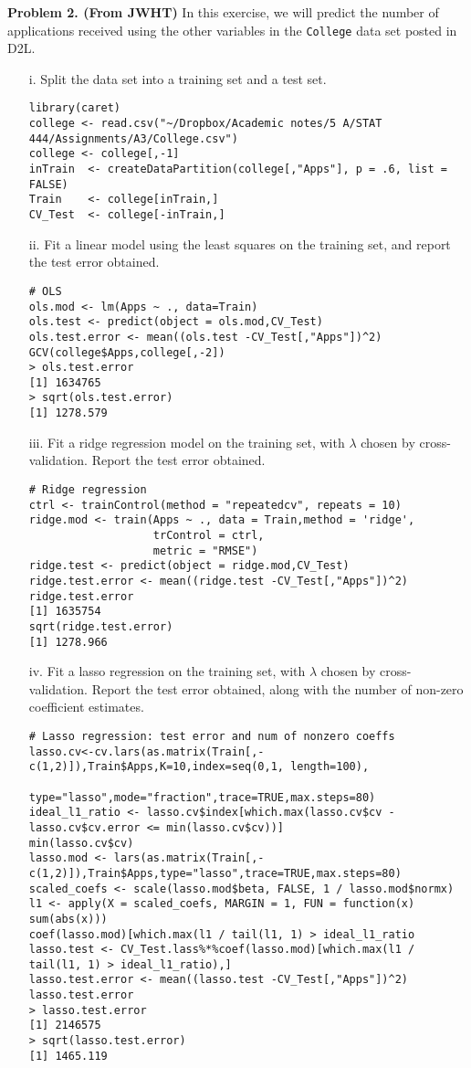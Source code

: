 \documentclass[11pt]{report}
\begin{document}
\noindent
\newpage
{\bf Problem 2. (From JWHT)} In this exercise, we will predict the number of applications received using the other variables in the {\tt College} data set posted in D2L.
\begin{itemize}
\item[i. ] Split the data set into a training set and a test set.
\begin{verbatim}
library(caret)
college <- read.csv("~/Dropbox/Academic notes/5 A/STAT 444/Assignments/A3/College.csv")
college <- college[,-1]
inTrain  <- createDataPartition(college[,"Apps"], p = .6, list = FALSE)
Train    <- college[inTrain,]
CV_Test  <- college[-inTrain,]
\end{verbatim}
\item[ii. ] Fit a linear model using the least squares on the training set, and report the test error obtained. 
\begin{verbatim}
# OLS
ols.mod <- lm(Apps ~ ., data=Train)
ols.test <- predict(object = ols.mod,CV_Test)
ols.test.error <- mean((ols.test -CV_Test[,"Apps"])^2)
GCV(college$Apps,college[,-2])
> ols.test.error
[1] 1634765
> sqrt(ols.test.error)
[1] 1278.579
\end{verbatim}
\item[iii. ] Fit a ridge regression model on the training set, with $\lambda$ chosen by cross-validation. Report the test error obtained.
\begin{verbatim}
# Ridge regression
ctrl <- trainControl(method = "repeatedcv", repeats = 10)
ridge.mod <- train(Apps ~ ., data = Train,method = 'ridge', 
                   trControl = ctrl,
                   metric = "RMSE")
ridge.test <- predict(object = ridge.mod,CV_Test)
ridge.test.error <- mean((ridge.test -CV_Test[,"Apps"])^2)
ridge.test.error
[1] 1635754
sqrt(ridge.test.error)
[1] 1278.966
\end{verbatim}

\item[iv. ] Fit a lasso regression on the training set, with $\lambda$ chosen by cross-validation. Report the test error obtained, along with the number of non-zero coefficient estimates.
\begin{verbatim}
# Lasso regression: test error and num of nonzero coeffs
lasso.cv<-cv.lars(as.matrix(Train[,-c(1,2)]),Train$Apps,K=10,index=seq(0,1, length=100),
                   type="lasso",mode="fraction",trace=TRUE,max.steps=80)
ideal_l1_ratio <- lasso.cv$index[which.max(lasso.cv$cv - lasso.cv$cv.error <= min(lasso.cv$cv))]
min(lasso.cv$cv)
lasso.mod <- lars(as.matrix(Train[,-c(1,2)]),Train$Apps,type="lasso",trace=TRUE,max.steps=80)
scaled_coefs <- scale(lasso.mod$beta, FALSE, 1 / lasso.mod$normx)
l1 <- apply(X = scaled_coefs, MARGIN = 1, FUN = function(x) sum(abs(x)))
coef(lasso.mod)[which.max(l1 / tail(l1, 1) > ideal_l1_ratio
lasso.test <- CV_Test.lass%*%coef(lasso.mod)[which.max(l1 / tail(l1, 1) > ideal_l1_ratio),]
lasso.test.error <- mean((lasso.test -CV_Test[,"Apps"])^2)
lasso.test.error
> lasso.test.error
[1] 2146575
> sqrt(lasso.test.error)
[1] 1465.119
\end{verbatim}


\end{itemize}
\end{document}
